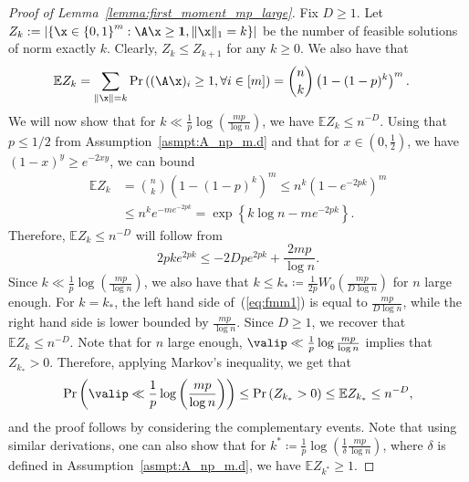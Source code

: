 \begin{proof}[Proof of Lemma~\ref{lemma:first_moment_mp_large}]
Fix \(D \geq 1\).
Let $Z_k := \lvert\left\{  \x \in \left \{0,1\right\}^m : \A\x \geq \mathbf{1}, \|\x\|_1 = k \right \}\rvert$ be the number of feasible solutions of norm exactly $k$. Clearly, \(Z_k \leq Z_{k+1}\) for any \(k \geq 0\). We also have that
\begin{align*}
    \mathbb{E}Z_k & = \sum_{\|\x\| = k}\Pr\left({(\A\x)_i \geq 1, \forall i\in [m]}\right) = \binom{n}{k}\left(1-(1-p)^k\right)^m.
\end{align*}
We will now show that for \(k \ll \frac{1}{p}\log\left(\frac{mp}{\log n}\right)\), we have \(\mathbb{E} Z_{k} \leq n^{-D}\). Using that \(p \leq 1/2\) from Assumption~\ref{asmpt:A_np_m.d} and that for \(x \in (0, \frac{1}{2})\), we have \((1 - x)^y \geq e^{-2xy}\), we can bound
    \begin{equation*}
    \begin{aligned}
        \mathbb{E} Z_k &= \binom{n}{k} (1 - (1 - p)^k)^m \leq n^k \left(1 - e^{-2pk}\right)^m \\
        &\leq n^k e^{-m e^{-2pk}} = \exp \left\{k \log n - m e^{-2pk}\right\}.
    \end{aligned}
    \end{equation*}
Therefore, \(\mathbb{E}Z_k \leq n^{-D}\) will follow from 
\begin{equation}
\label{eq:fmm1}
    2pk e^{2pk} \leq -2Dpe^{2pk} + \frac{2mp}{\log n}.
\end{equation}
Since \(k \ll \frac{1}{p} \log \left(\frac{mp}{\log n}\right)\), we also have that \(k \leq k_{\ast} \coloneqq \frac{1}{2p} W_0 \left(\frac{mp}{D \log n}\right) \) for \(n\) large enough. For \(k = k_{\ast}\),
the left hand side of~(\ref{eq:fmm1}) is equal to \(\frac{mp}{D \log n}\), while the right hand side is lower bounded by \(\frac{mp}{\log n}\). Since \(D \geq 1\), we recover that \(\mathbb{E}Z_k \leq n^{-D}\). Note that for \(n\) large enough, \(\valip \ll \frac 1 p \log \frac{mp}{\log n}\) implies that \(Z_{k_{\ast}} > 0\). Therefore, applying Markov's inequality, we get that 
\begin{equation}
\begin{aligned}
\Pr\left(\valip \ll \frac{1}{p} \log \left(\frac{mp}{\log n}\right)\right) \leq \Pr\left(Z_{k_{\ast}} > 0\right) \leq \mathbb{E} Z_{k_{\ast}} \leq n^{-D},
\end{aligned}
\end{equation}
and the proof follows by considering the complementary events. Note that using similar derivations, one can also show that for \(k^{\ast} \coloneqq \frac{1}{p}\log\left(\frac{1}{\delta}\frac{mp}{\log n}\right)\), where \(\delta\) is defined in Assumption~\ref{asmpt:A_np_m.d}, we have \(\mathbb{E} Z_{k^{\ast}} \geq 1\).
\end{proof}

